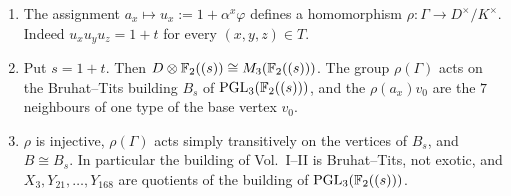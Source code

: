 \begin{theorem}\label{V3P6:thm:cs}
\begin{enumerate}
\item[(i)] The assignment $a_x\mapsto u_x:=1+\alpha^{x}\varphi$ defines a homomorphism
$\rho\colon\Gamma\to D^{\times}/K^{\times}$. Indeed $u_xu_yu_z=1+t$ for every $(x,y,z)\in T$.
\item[(ii)] Put $s=1+t$. Then $D\otimes\mathbb{F}_2((s))\cong M_3(\mathbb{F}_2((s)))$. The group $\rho(\Gamma)$
acts on the Bruhat--Tits building $B_s$ of $\mathrm{PGL}_3(\mathbb{F}_2((s)))$, and the $\rho(a_x)v_0$ are the
$7$ neighbours of one type of the base vertex $v_0$.
\item[(iii)] $\rho$ is injective, $\rho(\Gamma)$ acts simply transitively on the vertices of
$B_s$, and $B\cong B_s$. In particular the building of Vol.~I--II is Bruhat--Tits, not exotic,
and $X_3,Y_{21},\dots,Y_{168}$ are quotients of the building of $\mathrm{PGL}_3(\mathbb{F}_2((s)))$.
\end{enumerate}
\end{theorem}

